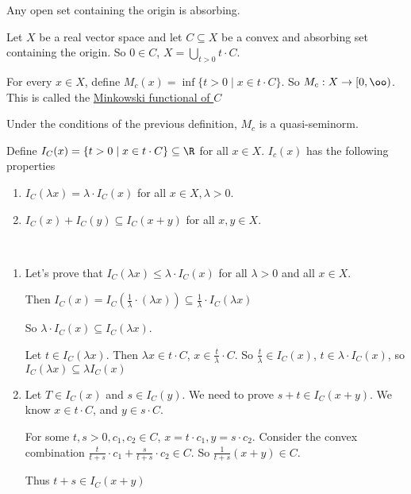 \documentclass[x11names,reqno,14pt]{extarticle}
\begin{document}
\exm

Any open set containing the origin is absorbing. 


Let $X$ be a real vector space and let $C \subseteq X$ be a convex and absorbing set containing the origin. So $0 \in C$, $X = \bigcup_{t>0}t\cdot C$. 

For every $x \in X$, define $M_c(x) = \inf\{t>0 \mid x \in t\cdot   C\}$. So $M_c:X\to[0,\oo)$. This is called the \underline{Minkowski functional of $C$}

\thm

Under the conditions of the previous definition, $M_c$ is a quasi-seminorm. 

\proof

\claim

Define $I_C(x) = \{t>0\mid x \in t\cdot C\} \subseteq \R$ for all $x \in X$. $I_c(x)$ has the following properties

\begin{enumerate}

\item $I_C(\lambda x) = \lambda\cdot I_C(x)$ for all $x \in X, \lambda > 0$. 

\item $I_C(x) + I_C(y) \subseteq I_C(x + y)$ for all $x, y \in X$.

\end{enumerate}

\proof\,

\begin{enumerate}

\item Let's prove that $I_C(\lambda x) \leq \lambda\cdot I_C(x)$ for all $\lambda>0$ and all $x \in X$. 

Then $I_C(x) = I_C(\frac{1}{\lambda}\cdot(\lambda x)) \subseteq \frac{1}{\lambda}\cdot I_C(\lambda x)$

So $\lambda\cdot I_C(x) \subseteq I_C(\lambda x)$. 

Let $t \in I_C(\lambda x)$. Then $\lambda x \in t\cdot C$, $x \in \frac{t}{\lambda}\cdot C$. So $\frac{t}{\lambda} \in I_C(x)$, $t \in \lambda\cdot I_C(x)$, so $I_C(\lambda x) \subseteq \lambda I_C(x)$

\item Let $T \in I_C(x)$ and $s \in I_C(y)$. We need to prove $s + t \in I_C(x + y)$. We know $x \in t\cdot C$, and $y \in s\cdot C$.

For some $t, s > 0, c_1, c_2 \in C$, $x = t\cdot c_1, y = s\cdot c_2$. Consider the convex combination $\frac{t}{t + s}\cdot c_1 + \frac{s}{t + s}\cdot c_2 \in C$. So $\frac{1}{t + s}(x + y) \in C$. 

Thus $t + s \in I_C(x + y)$

\end{enumerate}
\end{document}
